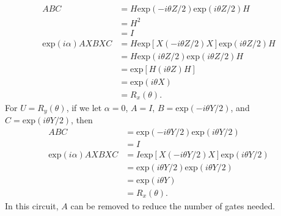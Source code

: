 \documentclass[a4paper,12pt]{article}
\begin{document}
\begin{enumerate}
        \begin{align*}
            ABC &= H \mbox{exp}(-i \theta Z / 2) \mbox{exp}(i \theta Z / 2) H \\
            &= H^2 \\
            &= I \\
            \mbox{exp}(i \alpha) AXBXC &= H \mbox{exp}[X(-i \theta Z / 2)X] \mbox{exp}(i \theta Z / 2) H \\
            &= H \mbox{exp}(i \theta Z / 2) \mbox{exp}(i \theta Z / 2) H \\
            &= \mbox{exp}[H(i \theta Z)H] \\
            &= \mbox{exp}(i \theta X) \\
            &= R_x(\theta).
        \end{align*}
        For $U = R_y(\theta)$, if we let $\alpha = 0$, $A = I$, $B = \mbox{exp}(-i \theta Y / 2)$, and $C = \mbox{exp}(i \theta Y / 2)$, then
        \begin{align*}
            ABC &= \mbox{exp}(-i \theta Y / 2) \mbox{exp}(i \theta Y / 2) \\
            &= I \\
            \mbox{exp}(i \alpha) AXBXC &= I \mbox{exp}[X(-i \theta Y / 2)X] \mbox{exp}(i \theta Y / 2) \\
            &= \mbox{exp}(i \theta Y / 2) \mbox{exp}(i \theta Y / 2) \\
            &= \mbox{exp}(i \theta Y) \\
            &= R_x(\theta).
        \end{align*}
        In this circuit, $A$ can be removed to reduce the number of gates needed.


\end{enumerate}
\end{document}
